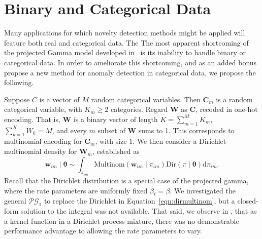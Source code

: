 \section{Binary and Categorical Data}
Many applications for which novelty detection methods might be applied will 
    feature both real and categorical data.  The  The most apparent 
    shortcoming of the projected Gamma model developed in~\cite{trubey:pg} is
    its inability to handle binary or categorical data.  In order to ameliorate this
    shortcoming, and as an added bonus propose a new method for anomaly detection in
    categorical data, we propose the following.

Suppose $C$ is a vector of $M$ random categorical variables.  Then $\bm{C}_{m}$ 
    is a random categorical variable, with $K_{m} \geq 2$ categories. Regard $\bm{W}$ 
    as $\bm{C}$, recoded in one-hot encoding.  That is, $\bm{W}$ is a binary vector of 
    length $K = \sum_{m = 1}^M K_{m}$, $\sum_{k = 1}^K W_k = M$, and every $m$ subset 
    of $\bm{W}$ sums to 1.  This corresponds to multinomial encoding for $\bm{C}_m$,
    with size 1. We then consider a Dirichlet-multinomial density for $\bm{W}_m$,
    established as
  \begin{equation}
    \label{eqn:dirmultinom}
    \bm{w}_{im}\mid\bm{\theta} 
    \sim 
    \int_{\pi_{im}} 
    \text{Multinom}(\bm{w}_{im}\mid\pi_{im})
    \text{Dir}(\pi\mid\bm{\theta})\text{d}\pi_{im}.
  \end{equation}
  Recall that the Dirichlet distribution is a special case of the projected gamma,
  where the rate parameters are uniformly fixed $\beta_{\ell} = \beta$.  We 
  investigated the general $\mathcal{PG}_1$ to replace the Dirichlet in 
  Equation~\ref{eqn:dirmultinom}, but a closed-form solution to the integral was 
  not available.  That said, we observe in \cite{trubey:pg}, that as a kernel 
  function in a Dirichlet process mixture, there was no demonstrable performance 
  advantage to allowing the rate parameters to vary.
 
